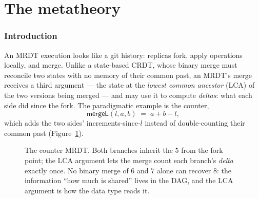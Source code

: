 \documentclass[11pt]{article}
\let\salInlinePart\part
\renewcommand{\part}{\clearpage\salInlinePart}
\newcommand{\mergeL}{\mathsf{mergeL}}
\begin{document}
\ifdefined\salPaperB\else
\part{The metatheory}

\section{Introduction}

An MRDT execution looks like a git history: replicas fork, apply
operations locally, and merge. Unlike a state-based CRDT, whose binary
merge must reconcile two states with no memory of their common past, an
MRDT's merge receives a third argument --- the state at the \emph{lowest
common ancestor} (LCA) of the two versions being merged --- and may use it
to compute \emph{deltas}: what each side did since the fork. The
paradigmatic example is the counter,
\[
  \mergeL(l,a,b) \;=\; a + b - l,
\]
which adds the two sides' increments-since-$l$ instead of double-counting
their common past (Figure~\ref{fig:counter}).

\begin{figure}[t]
\centering
{}
\caption{The counter MRDT. Both branches inherit the $5$ from the fork
point; the LCA argument lets the merge count each branch's \emph{delta}
exactly once. No binary merge of $6$ and $7$ alone can recover $8$: the
information ``how much is shared'' lives in the DAG, and the LCA argument
is how the data type reads it.}
\label{fig:counter}
\end{figure}
\end{document}
